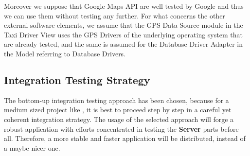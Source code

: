 Moreover we suppose that Google Maps API are well tested by Google and thus we can use them without testing any further.
For what concerns the other external software elements, we assume that the GPS Data Source module in the Taxi Driver View uses the GPS Drivers of the underlying operating system that are already tested, and the same is assumed for the Database Driver Adapter in the Model referring to Database Drivers.

\subsection{Integration Testing Strategy}
The bottom-up integration testing approach has been chosen, because for a medium sized project like \myTaxiService{}, it is best to proceed step by step in a careful yet coherent integration strategy.
The usage of the selected approach will forge a robust application with efforts concentrated in testing the \textbf{Server} parts before all.
Therefore, a more stable and faster application will be distributed, instead of a maybe nicer one.

